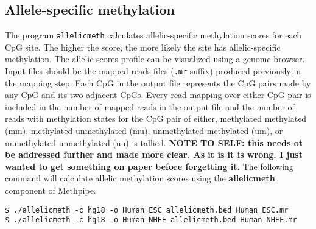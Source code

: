 \documentclass[10pt]{article}
\newcommand{\prog}[1]{\texttt{#1}}
\newcommand{\fn}[1]{\texttt{#1}}
\begin{document}



\subsection{Allele-specific methylation}
\label{sec:allelic_scores}

The program \prog{allelicmeth} calculates allelic-specific
methylation scores for each CpG site. The higher the score, the more
likely the site has allelic-specific methylation. The allelic scores
profile can be visualized using a genome browser. Input files should
be the mapped reads files (\fn{.mr} suffix) produced previously in the
mapping step. Each CpG in the output file represents the CpG pairs
made by any CpG and its two adjacent CpGs. Every read mapping over
either CpG pair is included in the number of mapped reads in the
output file and the number of reads with methylation states for the
CpG pair of either, methylated methylated (mm), methylated
unmethylated (mu), unmethylated methylated (um), or unmethylated
unmethylated (uu) is tallied. \textbf {NOTE TO SELF: this needs ot be
  addressed further and made more clear. As it is it is wrong. I just
  wanted to get something on paper before forgetting it.}  The
following command will calculate allelic methylation scores using the
\textbf{allelicmeth} component of Methpipe.
\begin{verbatim}
$ ./allelicmeth -c hg18 -o Human_ESC_allelicmeth.bed Human_ESC.mr
$ ./allelicmeth -c hg18 -o Human_NHFF_allelicmeth.bed Human_NHFF.mr
\end{verbatim}
\end{document}
